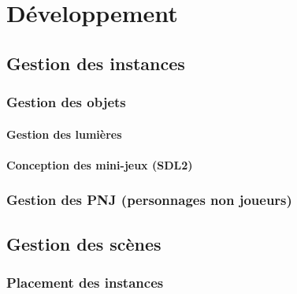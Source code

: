 \newpage
\section{Développement}



\subsection{Gestion des instances}
\subsubsection{Gestion des objets}
    \paragraph{Gestion des lumières}
    \paragraph{Conception des mini-jeux (SDL2)}
\subsubsection{Gestion des PNJ (personnages non joueurs)}
\subsection{Gestion des scènes}


\subsubsection{Placement des instances}